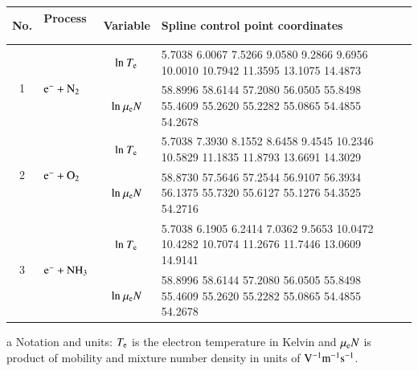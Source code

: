 \documentclass{warpdoc}
\renewcommand{\fontsizetable}{\footnotesize\scalefont{1.0}}
\begin{document}
\begin{table}[!htbp]
  \center\fontsizetable
  \begin{threeparttable}
    \label{tab:spline_tab}
    \fontsizetable
    \begin{tabular*}{\textwidth}{c@{\extracolsep{\fill}}lcll}
    \toprule
   No. & Process ~& Variable & Spline control point coordinates  \\
        \midrule

          
  \multirow{2}{*}{1} &  \multirow{2}{*}{ $\rm e^- + N_2  $   } & ${\rm ln}~T_{\rm e}$  & \tiny 5.7038    6.0067    7.5266    9.0580    9.2866    9.6956   10.0010   10.7942   11.3595   13.1075   14.4873     \\
  &  & ${\rm ln}~\mu_{\rm e}N$     & \tiny  58.8996   58.6144   57.2080   56.0505   55.8498   55.4609   55.2620   55.2282   55.0865   54.4855   54.2678  \\
  \midrule  
  \multirow{2}{*}{2} &  \multirow{2}{*}{ $\rm e^- + O_2  $   } & ${\rm ln}~T_{\rm e}$  & \tiny     5.7038    7.3930    8.1552    8.6458    9.4545   10.2346   10.5829   11.1835   11.8793   13.6691   14.3029 \\
  &  & ${\rm ln}~\mu_{\rm e}N$     & \tiny  58.8730   57.5646   57.2544   56.9107   56.3934   56.1375   55.7320   55.6127   55.1276   54.3525   54.2716    \\
  \midrule  
  \multirow{2}{*}{3} &  \multirow{2}{*}{ $\rm e^- + NH_3  $   } & ${\rm ln}~T_{\rm e}$  & \tiny     5.7038    6.1905    6.2414    7.0362    9.5653   10.0472   10.4282   10.7074   11.2676   11.7446   13.0609   14.9141 \\
  &  & ${\rm ln}~\mu_{\rm e}N$   & \tiny 58.8996   58.6144   57.2080   56.0505   55.8498   55.4609   55.2620   55.2282   55.0865   54.4855   54.2678 \\
     
 
                       
    \bottomrule
    \end{tabular*}
\begin{tablenotes}
\item[{a}] Notation and units: $T_{\rm e}$ is the electron temperature in Kelvin and $\mu_{\rm e}N$ is product of mobility and mixture number density in units of $\rm V^{-1}m^{-1}s^{-1}$.
\end{tablenotes}
   \end{threeparttable}
\end{table}
\end{document}
